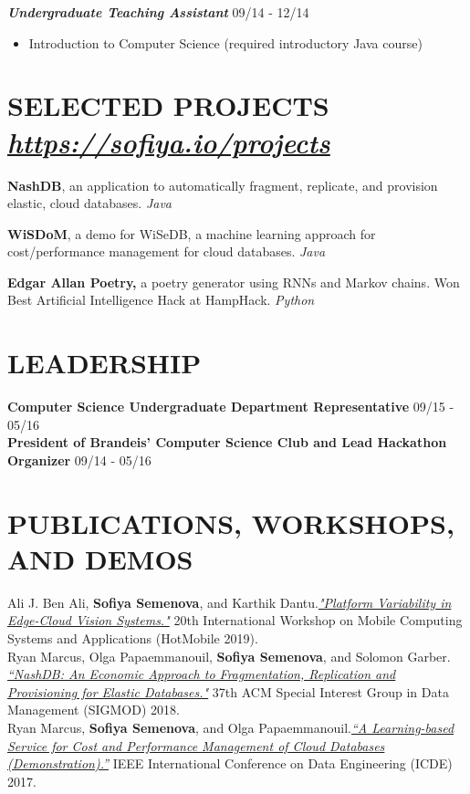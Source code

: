\documentclass{res}
\begin{document}
\begin{resume}
\textbf{\textit{Undergraduate Teaching Assistant}} \hfill 09/14 - 12/14 \\
	\begin{itemize}  \itemsep -2pt %
	\item Introduction to Computer Science (required introductory Java course)
	\end{itemize}

\section{SELECTED PROJECTS ~  {\sl \href{https://sofiya.io/projects}{https://sofiya.io/projects}}}

\textbf{NashDB}, an application to automatically fragment, replicate, and provision elastic, cloud databases. {\sl Java }

\textbf{WiSDoM}, a demo for WiSeDB, a machine learning approach for cost/performance management for cloud databases. {\sl Java}
		
\textbf{Edgar Allan Poetry,} a poetry generator using RNNs and Markov chains. Won Best Artificial Intelligence Hack at HampHack. {\sl Python}

\section{LEADERSHIP}  


\textbf{Computer Science Undergraduate Department Representative} \hfill 09/15 - 05/16 \\
\textbf{President of Brandeis' Computer Science Club and Lead Hackathon Organizer} \hfill 09/14 - 05/16 
	
\section{PUBLICATIONS, WORKSHOPS, AND DEMOS}     
	Ali J. Ben Ali, \textbf{Sofiya Semenova}, and Karthik Dantu.\href{https://dl.acm.org/citation.cfm?id=3309555}{\sl"Platform Variability in Edge-Cloud Vision Systems."} 20th International Workshop on Mobile Computing Systems and Applications (HotMobile 2019). \\        
	 Ryan Marcus, Olga Papaemmanouil, \textbf{Sofiya Semenova}, and Solomon Garber. \href{https://api.zotero.org/users/3604318/publications/items/35KTECTC/file/view}{\sl “NashDB: An Economic Approach to Fragmentation, Replication and Provisioning for Elastic Databases."} 37th ACM Special Interest Group in Data Management (SIGMOD) 2018. \\
	  Ryan Marcus, \textbf{Sofiya Semenova}, and Olga Papaemmanouil.\href{http://www.cs.brandeis.edu/~olga/publications/icde17-demo.pdf}{\sl “A Learning-based Service for Cost and Performance Management of Cloud Databases (Demonstration).”} IEEE International Conference on Data Engineering (ICDE) 2017.

\end{resume}
\end{document}
